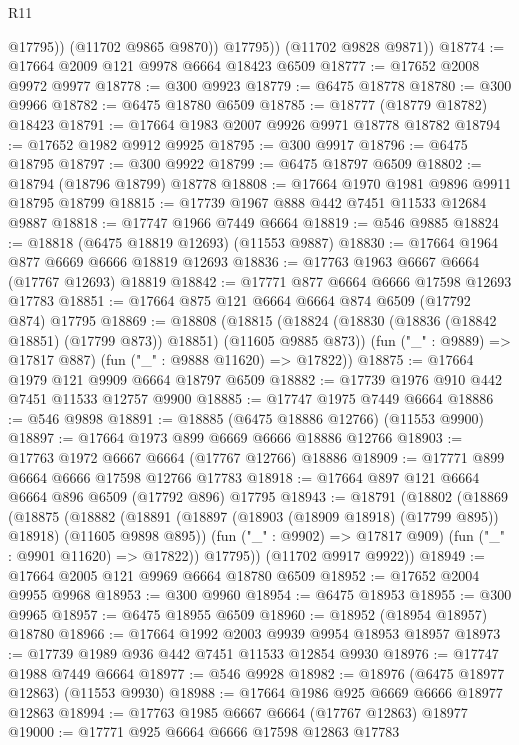 \begin{lexlean}{R11}
\begin{coremodule}
{{{{{{{{{{{{{{{{{{{{{{{{{{{{{{{{{{{{{{{{{{{{{{{{{{{{{{{{{{{{{{{{{{{{{{{{{{{{{{{{{{                @17795))
            (@11702 @9865 @9870))
          @17795))
      (@11702 @9828 @9871))
@18774 := @17664 @2009 @121 @9978 @6664 @18423 @6509
@18777 := @17652 @2008 @9972 @9977
@18778 := @300 @9923
@18779 := @6475 @18778
@18780 := @300 @9966
@18782 := @6475 @18780 @6509
@18785 := @18777 (@18779 @18782) @18423
@18791 := @17664 @1983 @2007 @9926 @9971 @18778 @18782
@18794 := @17652 @1982 @9912 @9925
@18795 := @300 @9917
@18796 := @6475 @18795
@18797 := @300 @9922
@18799 := @6475 @18797 @6509
@18802 := @18794 (@18796 @18799) @18778
@18808 := @17664 @1970 @1981 @9896 @9911 @18795 @18799
@18815 := @17739 @1967 @888 @442 @7451 @11533 @12684 @9887
@18818 := @17747 @1966 @7449 @6664
@18819 := @546 @9885
@18824 := @18818 (@6475 @18819 @12693) (@11553 @9887)
@18830 := @17664 @1964 @877 @6669 @6666 @18819 @12693
@18836 := @17763 @1963 @6667 @6664 (@17767 @12693) @18819
@18842 := @17771 @877 @6664 @6666 @17598 @12693 @17783
@18851 := @17664 @875 @121 @6664 @6664 @874 @6509 (@17792 @874) @17795
@18869 := @18808
    (@18815
      (@18824 (@18830 (@18836 (@18842 @18851) (@17799 @873)) @18851) (@11605 @9885 @873))
      (fun ("_" : @9889) => @17817 @887)
      (fun ("_" : @9888 @11620) => @17822))
@18875 := @17664 @1979 @121 @9909 @6664 @18797 @6509
@18882 := @17739 @1976 @910 @442 @7451 @11533 @12757 @9900
@18885 := @17747 @1975 @7449 @6664
@18886 := @546 @9898
@18891 := @18885 (@6475 @18886 @12766) (@11553 @9900)
@18897 := @17664 @1973 @899 @6669 @6666 @18886 @12766
@18903 := @17763 @1972 @6667 @6664 (@17767 @12766) @18886
@18909 := @17771 @899 @6664 @6666 @17598 @12766 @17783
@18918 := @17664 @897 @121 @6664 @6664 @896 @6509 (@17792 @896) @17795
@18943 := @18791
    (@18802
      (@18869
        (@18875
          (@18882
            (@18891 (@18897 (@18903 (@18909 @18918) (@17799 @895)) @18918) (@11605 @9898 @895))
            (fun ("_" : @9902) => @17817 @909)
            (fun ("_" : @9901 @11620) => @17822))
          @17795))
      (@11702 @9917 @9922))
@18949 := @17664 @2005 @121 @9969 @6664 @18780 @6509
@18952 := @17652 @2004 @9955 @9968
@18953 := @300 @9960
@18954 := @6475 @18953
@18955 := @300 @9965
@18957 := @6475 @18955 @6509
@18960 := @18952 (@18954 @18957) @18780
@18966 := @17664 @1992 @2003 @9939 @9954 @18953 @18957
@18973 := @17739 @1989 @936 @442 @7451 @11533 @12854 @9930
@18976 := @17747 @1988 @7449 @6664
@18977 := @546 @9928
@18982 := @18976 (@6475 @18977 @12863) (@11553 @9930)
@18988 := @17664 @1986 @925 @6669 @6666 @18977 @12863
@18994 := @17763 @1985 @6667 @6664 (@17767 @12863) @18977
@19000 := @17771 @925 @6664 @6666 @17598 @12863 @17783
}}}}}}}}}}}}}}}}}}}}}}}}}}}}}}}}}}}}}}}}}}}}}}}}}}}}}}}}}}}}}}}}}}}}}}}}}}}}}}}}}}
\end{coremodule}
\end{lexlean}
